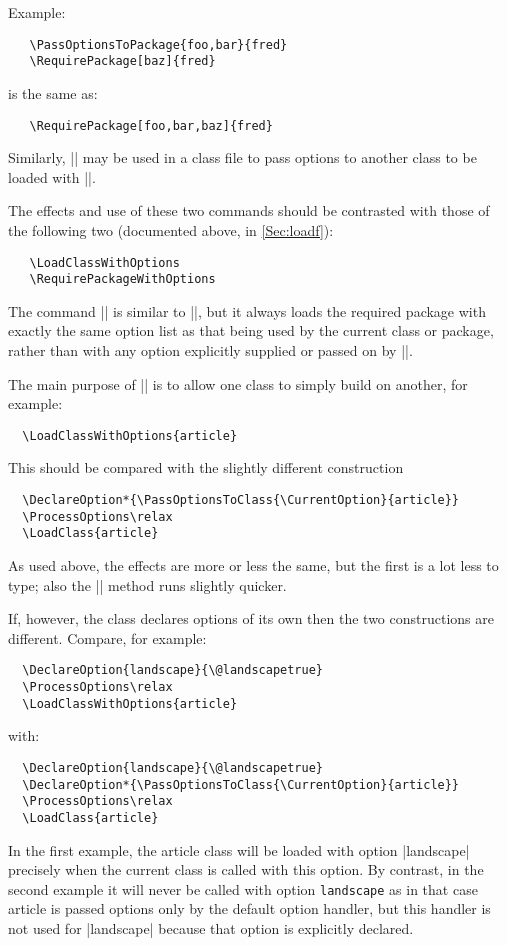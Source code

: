 \documentclass[11pt]{ltxguide}[1995/11/28]
\begin{document}
Example:
\begin{verbatim}
   \PassOptionsToPackage{foo,bar}{fred}
   \RequirePackage[baz]{fred}
\end{verbatim}
is the same as:
\begin{verbatim}
   \RequirePackage[foo,bar,baz]{fred}
\end{verbatim}

Similarly, |\PassOptionsToClass| may be used in a class file to pass
options to another class to be loaded with |\LoadClass|.

The effects and use of these two commands should be contrasted with
those of the following two (documented above, in \ref{Sec:loadf}):
\begin{verbatim}
   \LoadClassWithOptions
   \RequirePackageWithOptions
\end{verbatim}
The command || is similar to
|\RequirePackage|, but it always loads the required package with
exactly the same option list as that being used by the current class
or package, rather than with any option explicitly supplied or passed
on by |\PassOptionsToPackage|.

The main purpose of |\LoadClassWithOptions| is to allow one class to
simply build on another, for example:
\begin{verbatim}
  \LoadClassWithOptions{article}
\end{verbatim}
This should be compared with the slightly different construction
\begin{verbatim}
  \DeclareOption*{\PassOptionsToClass{\CurrentOption}{article}}
  \ProcessOptions\relax
  \LoadClass{article}
\end{verbatim}
As used above, the effects are more or less the same, but the first is
a lot less to type; also the |\LoadClassWithOptions| method runs
slightly quicker.

If, however, the class declares options of its own then
the two constructions are different.  Compare, for example:
\begin{verbatim}
  \DeclareOption{landscape}{\@landscapetrue}
  \ProcessOptions\relax
  \LoadClassWithOptions{article}
\end{verbatim}
with:
\begin{verbatim}
  \DeclareOption{landscape}{\@landscapetrue}
  \DeclareOption*{\PassOptionsToClass{\CurrentOption}{article}}
  \ProcessOptions\relax
  \LoadClass{article}
\end{verbatim}
In the first example, the \textsf{article} class will be loaded with
option |landscape| precisely when the current class is called with
this option. By contrast, in the second example it will never be
called with option \texttt{landscape} as in that case \textsf{article}
is passed options only by the default option handler, but this handler
is not used for |landscape| because that option is explicitly
declared.
\end{document}
